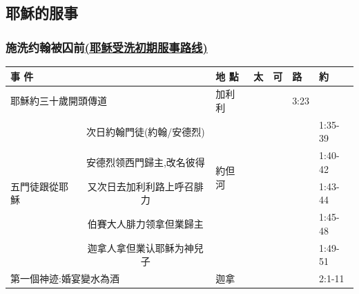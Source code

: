 \subsection{耶穌的服事}

\subsubsection{施洗约翰被囚前\href{http://biblegeography.holylight.org.tw/index/condensedbible_map_detail?m_id=108}{(耶稣受洗初期服事路线)}}
\begin{table}[H]
\centering
\begin{tabular}{p{6.45em}|c|p{4.785em}|r|p{}|p{3.23em}|p{3.5em}}\toprule

\multicolumn{2}{p{20.5em}|}{事 件} & 地 點& \multicolumn{1}{p{3.23em}|}{太} & \multicolumn{1}{p{3.23em}|}{可}    & \multicolumn{1}{p{3.23em}|}{路} & \multicolumn{1}{p{3.5em}}{約} \\\midrule\midrule

\multicolumn{2}{p{20.5em}|}{耶穌約三十歲開頭傳道} & \multicolumn{1}{p{5.355em}|}{加利利} &\multicolumn{1}{p{4.145em}|}{}&\multicolumn{1}{p{3.85em}|}{}&\multicolumn{1}{p{3.5em}|}{3:23}& \\ \midrule

\multirow{5}[8]{*}{五門徒跟從耶穌} & \multicolumn{1}{p{13.355em}|}{次日約翰門徒(約翰/安德烈)} & \multirow{4}[8]{*}{約但河} & & && 1:35-39 \\

\cmidrule{2-2}\cmidrule{4-7}    \multicolumn{1}{c|}{} & \multicolumn{1}{p{13.355em}|}{安德烈领西門歸主,改名彼得} & \multicolumn{1}{c|}{} & & & & 1:40-42 \\

\cmidrule{2-2}\cmidrule{4-7}    \multicolumn{1}{c|}{} & \multicolumn{1}{p{13.355em}|}{又次日去加利利路上呼召腓力} & \multicolumn{1}{c|}{} &  & & & 1:43-44 \\

\cmidrule{2-2}\cmidrule{4-7}\multicolumn{1}{c|}{} & \multicolumn{1}{p{13.355em}|}{伯賽大人腓力领拿但業歸主}&\multicolumn{1}{c|}{}&&&&1:45-48\\

\cmidrule{2-2}\cmidrule{4-7}\multicolumn{1}{c|}{} & \multicolumn{1}{p{13.355em}|}{迦拿人拿但業认耶稣为神兒子}&\multicolumn{1}{c|}{}&&&&1:49-51\\\midrule

\multicolumn{2}{p{20.5em}|}{第一個神迹:婚宴變水為酒}&迦拿&&&& 2:1-11\\\midrule


\end{tabular}
\end{table}
